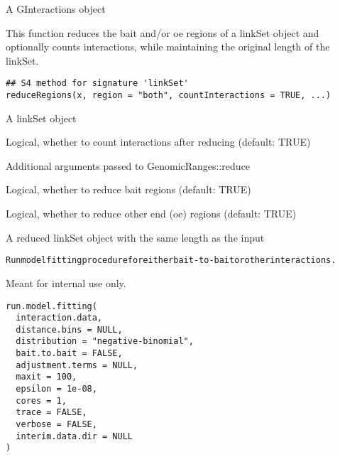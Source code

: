 \documentclass[letterpaper]{book}
\begin{document}
%
\begin{Value}
A GInteractions object
\end{Value}
%
\begin{Description}
This function reduces the bait and/or oe regions of a linkSet object and optionally counts interactions,
while maintaining the original length of the linkSet.
\end{Description}
%
\begin{Usage}
\begin{verbatim}
## S4 method for signature 'linkSet'
reduceRegions(x, region = "both", countInteractions = TRUE, ...)
\end{verbatim}
\end{Usage}
%
\begin{Arguments}
\begin{ldescription}
\item[\code{x}] A linkSet object

\item[\code{countInteractions}] Logical, whether to count interactions after reducing (default: TRUE)

\item[\code{...}] Additional arguments passed to GenomicRanges::reduce

\item[\code{reduceBait}] Logical, whether to reduce bait regions (default: TRUE)

\item[\code{reduceOE}] Logical, whether to reduce other end (oe) regions (default: TRUE)
\end{ldescription}
\end{Arguments}
%
\begin{Value}
A reduced linkSet object with the same length as the input
\end{Value}
%
\begin{Description}
\begin{alltt}Run model fitting procedure for either bait-to-bait or other interactions.
\end{alltt}


Meant for internal use only.
\end{Description}
%
\begin{Usage}
\begin{verbatim}
run.model.fitting(
  interaction.data,
  distance.bins = NULL,
  distribution = "negative-binomial",
  bait.to.bait = FALSE,
  adjustment.terms = NULL,
  maxit = 100,
  epsilon = 1e-08,
  cores = 1,
  trace = FALSE,
  verbose = FALSE,
  interim.data.dir = NULL
)
\end{verbatim}
\end{Usage}
\end{document}
